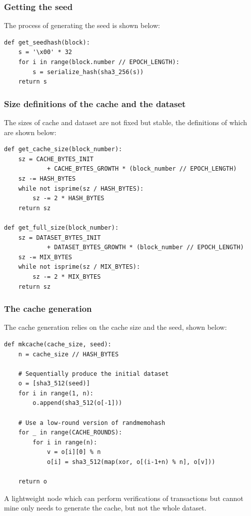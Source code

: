 \documentclass[11pt]{article}
\begin{document}
\subsubsection{Getting the seed}
The process of generating the seed is shown below:

\begin{lstlisting}
def get_seedhash(block):
    s = '\x00' * 32
    for i in range(block.number // EPOCH_LENGTH):
        s = serialize_hash(sha3_256(s))
    return s
\end{lstlisting}

\subsubsection{Size definitions of the cache and the dataset}
The sizes of cache and dataset are not fixed but stable, the definitions of which are shown below:

\begin{lstlisting}
def get_cache_size(block_number):
    sz = CACHE_BYTES_INIT 
    		+ CACHE_BYTES_GROWTH * (block_number // EPOCH_LENGTH)
    sz -= HASH_BYTES
    while not isprime(sz / HASH_BYTES):
        sz -= 2 * HASH_BYTES
    return sz

def get_full_size(block_number):
    sz = DATASET_BYTES_INIT 
    		+ DATASET_BYTES_GROWTH * (block_number // EPOCH_LENGTH)
    sz -= MIX_BYTES
    while not isprime(sz / MIX_BYTES):
        sz -= 2 * MIX_BYTES
    return sz
\end{lstlisting}

\subsubsection{The cache generation}
The cache generation relies on the cache size and the seed, shown below:

\begin{lstlisting}
def mkcache(cache_size, seed):
    n = cache_size // HASH_BYTES

    # Sequentially produce the initial dataset
    o = [sha3_512(seed)]
    for i in range(1, n):
        o.append(sha3_512(o[-1]))

    # Use a low-round version of randmemohash
    for _ in range(CACHE_ROUNDS):
        for i in range(n):
            v = o[i][0] % n
            o[i] = sha3_512(map(xor, o[(i-1+n) % n], o[v]))

    return o
\end{lstlisting}

A lightweight node which can perform verifications of transactions but cannot mine only needs to generate the cache, but not the whole dataset.
\end{document}
